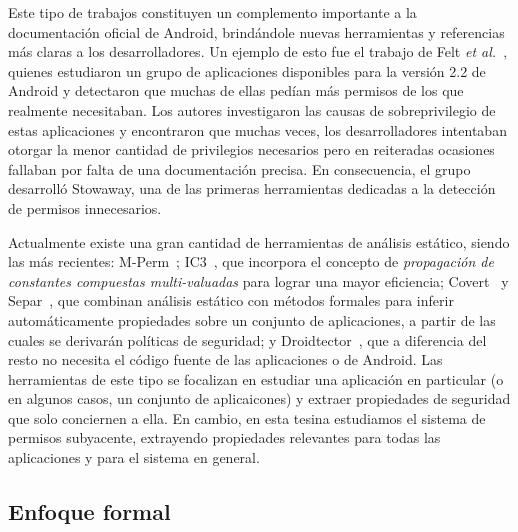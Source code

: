 Este tipo de trabajos constituyen un complemento importante a la documentación
oficial de Android, brindándole nuevas herramientas y referencias más claras a
los desarrolladores. Un ejemplo de esto fue el trabajo de Felt \textit{et
al.}~\cite{felt}, quienes estudiaron un grupo de aplicaciones disponibles para
la versión 2.2 de Android y detectaron que muchas de ellas pedían más permisos
de los que realmente necesitaban. Los autores investigaron las causas de
sobreprivilegio de estas aplicaciones y encontraron que muchas veces, los
desarrolladores intentaban otorgar la menor cantidad de privilegios necesarios
pero en reiteradas ocasiones fallaban por falta de una documentación precisa. En
consecuencia, el grupo desarrolló Stowaway, una de las primeras herramientas
dedicadas a la detección de permisos innecesarios.

%
Actualmente existe una gran cantidad de herramientas de análisis estático,
siendo las más recientes: M-Perm~\cite{mperm}; IC3~\cite{ic3}, que incorpora el
concepto de \textit{propagación de constantes compuestas multi-valuadas} para
lograr una mayor eficiencia; Covert~\cite{covert} y Separ~\cite{separ}, que
combinan análisis estático con métodos formales para inferir automáticamente
propiedades sobre un conjunto de aplicaciones, a partir de las cuales se
derivarán políticas de seguridad; y Droidtector~\cite{droidtector}, que a
diferencia del resto no necesita el código fuente de las aplicaciones o de
Android. Las herramientas de este tipo se focalizan en estudiar una aplicación en
particular (o en algunos casos, un conjunto de aplicaicones) y extraer
propiedades de seguridad que solo conciernen a ella. En cambio, en esta tesina
estudiamos el sistema de permisos subyacente, extrayendo propiedades relevantes
para todas las aplicaciones y para el sistema en general.


\subsection*{Enfoque formal}

